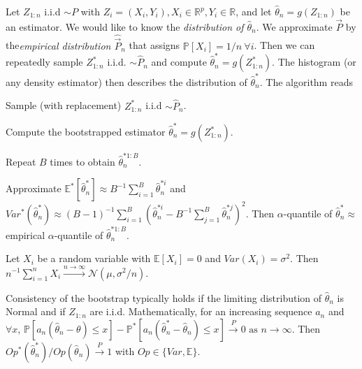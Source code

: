 \begin{sectionbox}\nospacing{}
  Let $Z_{1:n}$ i.i.d $\sim P$ with $Z_i=(X_i, Y_i), X_i \in \mathbb{R}^p, Y_i \in \mathbb{R}$, and let $\hat \theta_n = g(Z_{1:n})$ be an estimator.
  We would like to know the \emph{distribution of $\hat \theta_n$}.
  We approximate $\vec{P}$ by the\emph{empirical distribution $\hat{\vec{P}}_n$} that assigns $\mathbb{P}[X_i] = 1/n\ \forall i$.
  Then we can repeatedly sample $Z_{1:n}^\ast$ i.i.d. $\sim \hat P_n$ and compute $\hat\theta_n^\ast = g(Z_{1:n}^\ast)$.
  The histogram (or any density estimator) then describes the distribution of $\hat{\theta}_n^\ast$.
  The algorithm reads
  \begin{enumeratenosep}
    \item Sample (with replacement) $Z_{1:n}^\ast$ i.i.d $\sim \hat P_n$.
    \item Compute the bootstrapped estimator $\hat\theta_n^\ast=g(Z_{1:n}^\ast)$.
    \item Repeat $B$ times to obtain $\hat \theta_n^{\ast 1:B}$.
    \item Approximate $\mathbb{E}^\ast[\hat\theta_n^\ast] \approx B^{-1}\sum_{i=1}^B\hat\theta_n^{\ast i}$ and $Var^\ast(\hat\theta_n^\ast) \approx (B-1)^{-1}\sum_{i=1}^B\left(\hat\theta_n^{\ast i} - B^{-1}\sum_{j=1}^B \hat\theta_n^{\ast j}\right)^2$.
      Then $\alpha$-quantile of $\hat\theta_n^\ast \approx $ empirical $\alpha$-quantile of $\hat\theta_n^{\ast 1:B}$.
  \end{enumeratenosep}
\end{sectionbox}

\begin{notebox}\nospacing{}
  Let $X_i$ be a random variable with $\mathbb{E}[X_i] = 0$ and $Var(X_i) = \sigma^2$. Then $n^{-1}\sum_{i=1}^nX_i \overset{n\to \infty}{\to} \mathcal{N}(\mu, \sigma^2/n)$.
\end{notebox}
\begin{notebox}\nospacing{}
  Consistency of the bootstrap typically holds if the limiting distribution of $\hat \theta_n$ is Normal and if $Z_{1:n}$ are i.i.d. 
  Mathematically, for an increasing sequence $a_n$ and $\forall x$, $\mathbb{P}[a_n(\hat\theta_n-\theta)\leq x] - \mathbb{P}^\ast[a_n(\hat\theta_n^\ast - \hat \theta_n) \leq x] \overset{P}\to 0 \text{ as } n \to \infty$.
  Then $Op^\ast(\hat\theta_n^\ast)/Op(\hat\theta_n) \overset{P}{\to} 1$ with $Op \in \{Var, \mathbb{E}\}$.
\end{notebox}

